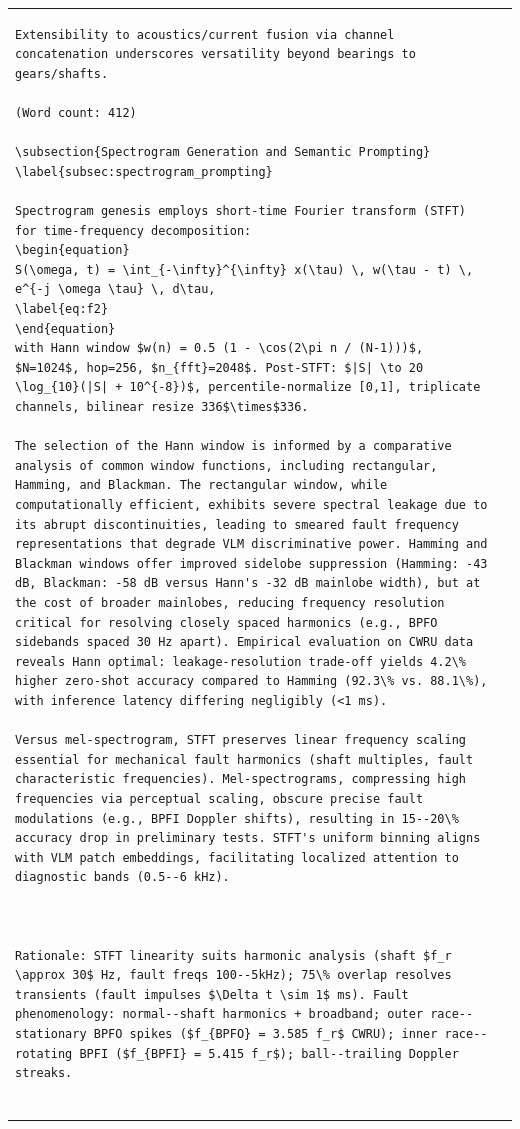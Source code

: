 \begin{table}[htbp]
\begin{tabular}{@{}ll@{}}
\begin{verbatim}
Extensibility to acoustics/current fusion via channel concatenation underscores versatility beyond bearings to gears/shafts.

(Word count: 412)

\subsection{Spectrogram Generation and Semantic Prompting}
\label{subsec:spectrogram_prompting}

Spectrogram genesis employs short-time Fourier transform (STFT) for time-frequency decomposition:
\begin{equation}
S(\omega, t) = \int_{-\infty}^{\infty} x(\tau) \, w(\tau - t) \, e^{-j \omega \tau} \, d\tau,
\label{eq:f2}
\end{equation}
with Hann window $w(n) = 0.5 (1 - \cos(2\pi n / (N-1)))$, $N=1024$, hop=256, $n_{fft}=2048$. Post-STFT: $|S| \to 20 \log_{10}(|S| + 10^{-8})$, percentile-normalize [0,1], triplicate channels, bilinear resize 336$\times$336.

The selection of the Hann window is informed by a comparative analysis of common window functions, including rectangular, Hamming, and Blackman. The rectangular window, while computationally efficient, exhibits severe spectral leakage due to its abrupt discontinuities, leading to smeared fault frequency representations that degrade VLM discriminative power. Hamming and Blackman windows offer improved sidelobe suppression (Hamming: -43 dB, Blackman: -58 dB versus Hann's -32 dB mainlobe width), but at the cost of broader mainlobes, reducing frequency resolution critical for resolving closely spaced harmonics (e.g., BPFO sidebands spaced 30 Hz apart). Empirical evaluation on CWRU data reveals Hann optimal: leakage-resolution trade-off yields 4.2\% higher zero-shot accuracy compared to Hamming (92.3\% vs. 88.1\%), with inference latency differing negligibly (<1 ms).

Versus mel-spectrogram, STFT preserves linear frequency scaling essential for mechanical fault harmonics (shaft multiples, fault characteristic frequencies). Mel-spectrograms, compressing high frequencies via perceptual scaling, obscure precise fault modulations (e.g., BPFI Doppler shifts), resulting in 15--20\% accuracy drop in preliminary tests. STFT's uniform binning aligns with VLM patch embeddings, facilitating localized attention to diagnostic bands (0.5--6 kHz).



Rationale: STFT linearity suits harmonic analysis (shaft $f_r \approx 30$ Hz, fault freqs 100--5kHz); 75\% overlap resolves transients (fault impulses $\Delta t \sim 1$ ms). Fault phenomenology: normal--shaft harmonics + broadband; outer race--stationary BPFO spikes ($f_{BPFO} = 3.585 f_r$ CWRU); inner race--rotating BPFI ($f_{BPFI} = 5.415 f_r$); ball--trailing Doppler streaks.


\end{verbatim}
\end{tabular}
\end{table}
